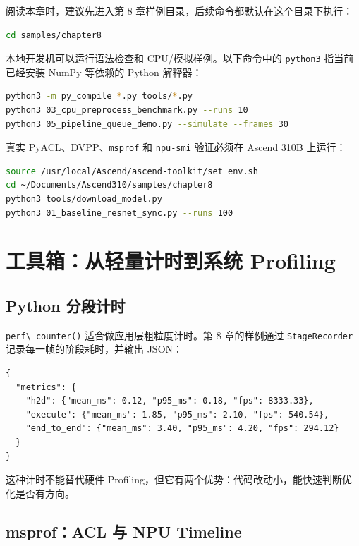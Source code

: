 阅读本章时，建议先进入第 8 章样例目录，后续命令都默认在这个目录下执行：

\begin{lstlisting}[language=bash]
cd samples/chapter8
\end{lstlisting}

本地开发机可以运行语法检查和 CPU/模拟样例。以下命令中的
\passthrough{\lstinline!python3!} 指当前已经安装 NumPy 等依赖的 Python
解释器：

\begin{lstlisting}[language=bash]
python3 -m py_compile *.py tools/*.py
python3 03_cpu_preprocess_benchmark.py --runs 10
python3 05_pipeline_queue_demo.py --simulate --frames 30
\end{lstlisting}

真实 PyACL、DVPP、\passthrough{\lstinline!msprof!} 和
\passthrough{\lstinline!npu-smi!} 验证必须在 Ascend 310B 上运行：

\begin{lstlisting}[language=bash]
source /usr/local/Ascend/ascend-toolkit/set_env.sh
cd ~/Documents/Ascend310/samples/chapter8
python3 tools/download_model.py
python3 01_baseline_resnet_sync.py --runs 100
\end{lstlisting}

\section{工具箱：从轻量计时到系统 Profiling}\label{src-book-chapter8-h3}

\subsection{Python 分段计时}\label{src-book-chapter8-h4}

\passthrough{\lstinline!perf\_counter()!} 适合做应用层粗粒度计时。第 8
章的样例通过 \passthrough{\lstinline!StageRecorder!}
记录每一帧的阶段耗时，并输出 JSON：

\begin{lstlisting}
{
  "metrics": {
    "h2d": {"mean_ms": 0.12, "p95_ms": 0.18, "fps": 8333.33},
    "execute": {"mean_ms": 1.85, "p95_ms": 2.10, "fps": 540.54},
    "end_to_end": {"mean_ms": 3.40, "p95_ms": 4.20, "fps": 294.12}
  }
}
\end{lstlisting}

这种计时不能替代硬件
Profiling，但它有两个优势：代码改动小，能快速判断优化是否有方向。

\subsection{msprof：ACL 与 NPU Timeline}\label{src-book-chapter8-h5}

